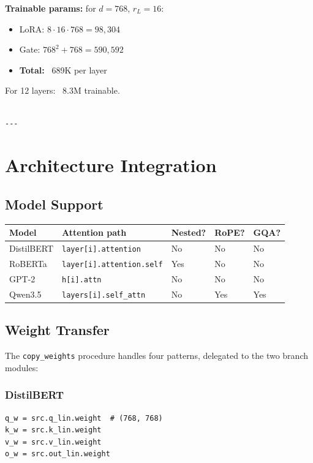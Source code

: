 \textbf{Trainable params:} for $d = 768$, $r_L = 16$:
\begin{itemize}
\item LoRA: $8 \cdot 16 \cdot 768 = 98,304$
\item Gate: $768^2 + 768 = 590,592$
\item \textbf{Total:} ~689K per layer

\end{itemize}
For 12 layers: ~8.3M trainable.
\begin{lstlisting}

---
\end{lstlisting}

\section{Architecture Integration}

\subsection{Model Support}

\begin{table}[H]
\centering
\small
\begin{tabular}{lllll}
\toprule
\textbf{Model} & \textbf{Attention path} & \textbf{Nested?} & \textbf{RoPE?} & \textbf{GQA?} \\
\midrule
DistilBERT & \texttt{layer[i].attention} & No & No & No \\
RoBERTa & \texttt{layer[i].attention.self} & Yes & No & No \\
GPT-2 & \texttt{h[i].attn} & No & No & No \\
Qwen3.5 & \texttt{layers[i].self\_attn} & No & Yes & Yes \\
\bottomrule
\end{tabular}
\end{table}

\subsection{Weight Transfer}

The \texttt{copy\_weights} procedure handles four patterns, delegated to the two 
branch modules:

\subsubsection{DistilBERT}

\begin{lstlisting}
q_w = src.q_lin.weight  # (768, 768)
k_w = src.k_lin.weight
v_w = src.v_lin.weight
o_w = src.out_lin.weight
\end{lstlisting}

